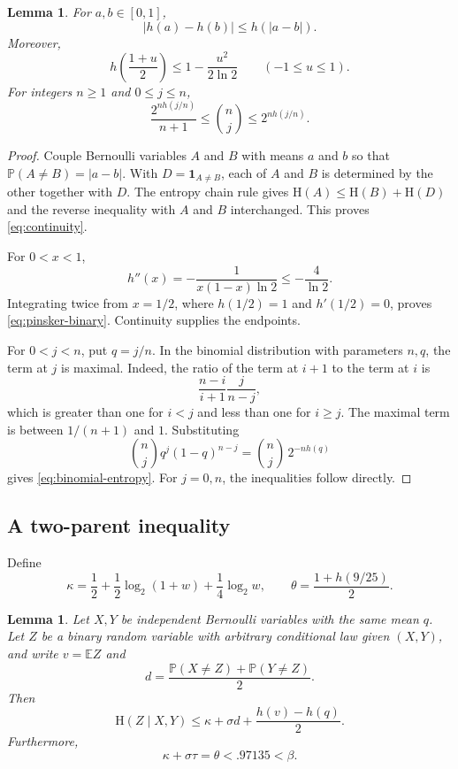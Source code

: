 \documentclass[11pt,leqno]{amsart}
\numberwithin{equation}{section}
\newtheorem{lemma}[theorem]{Lemma}
\theoremstyle{definition}
\theoremstyle{remark}
\newcommand{\E}{\mathbb E}
\newcommand{\Prob}{\mathbb P}
\newcommand{\one}{\mathbf 1}
\newcommand{\HH}{\mathrm H}
\newcommand{\abs}[1]{\lvert#1\rvert}
\begin{document}
\begin{lemma}\label{lem:elementary-entropy}
For $a,b\in[0,1]$,
\begin{equation}\label{eq:continuity}
 \abs{h(a)-h(b)}\le h(\abs{a-b}).
\end{equation}
Moreover,
\begin{equation}\label{eq:pinsker-binary}
 h\left(\frac{1+u}{2}\right)\le1-\frac{u^2}{2\ln2}
 \qquad(-1\le u\le1).
\end{equation}
For integers $n\ge1$ and $0\le j\le n$,
\begin{equation}\label{eq:binomial-entropy}
 \frac{2^{n h(j/n)}}{n+1}\le\binom nj\le 2^{n h(j/n)}.
\end{equation}
\end{lemma}

\begin{proof}
Couple Bernoulli variables $A$ and $B$ with means $a$ and $b$ so that $\Prob(A\ne B)=\abs{a-b}$. With $D=\one_{A\ne B}$, each of $A$ and $B$ is determined by the other together with $D$. The entropy chain rule gives $\HH(A)\le\HH(B)+\HH(D)$ and the reverse inequality with $A$ and $B$ interchanged. This proves \eqref{eq:continuity}.

For $0<x<1$,
\[
 h''(x)=-\frac{1}{x(1-x)\ln2}\le-\frac4{\ln2}.
\]
Integrating twice from $x=1/2$, where $h(1/2)=1$ and $h'(1/2)=0$, proves \eqref{eq:pinsker-binary}. Continuity supplies the endpoints.

For $0<j<n$, put $q=j/n$. In the binomial distribution with parameters $n,q$, the term at $j$ is maximal. Indeed, the ratio of the term at $i+1$ to the term at $i$ is
\[
 \frac{n-i}{i+1}\frac{j}{n-j},
\]
which is greater than one for $i<j$ and less than one for $i\ge j$. The maximal term is between $1/(n+1)$ and $1$. Substituting
\[
 \binom nj q^j(1-q)^{n-j}=\binom nj\,2^{-n h(q)}
\]
gives \eqref{eq:binomial-entropy}. For $j=0,n$, the inequalities follow directly.
\end{proof}

\subsection{A two-parent inequality}

Define
\begin{equation}\label{eq:kappa-theta}
 \kappa=\frac12+\frac12\log_2(1+w)+\frac14\log_2 w,
 \qquad \theta=\frac{1+h(9/25)}2.
\end{equation}

\begin{lemma}\label{lem:two-parent}
Let $X,Y$ be independent Bernoulli variables with the same mean $q$. Let $Z$ be a binary random variable with arbitrary conditional law given $(X,Y)$, and write $v=\E Z$ and
\[
 d=\frac{\Prob(X\ne Z)+\Prob(Y\ne Z)}2.
\]
Then
\begin{equation}\label{eq:two-parent}
 \HH(Z\mid X,Y)\le
 \kappa+\sigma d+\frac{h(v)-h(q)}2.
\end{equation}
Furthermore,
\begin{equation}\label{eq:theta-identity}
 \kappa+\sigma\tau=\theta<.97135<\beta.
\end{equation}
\end{lemma}
\end{document}
